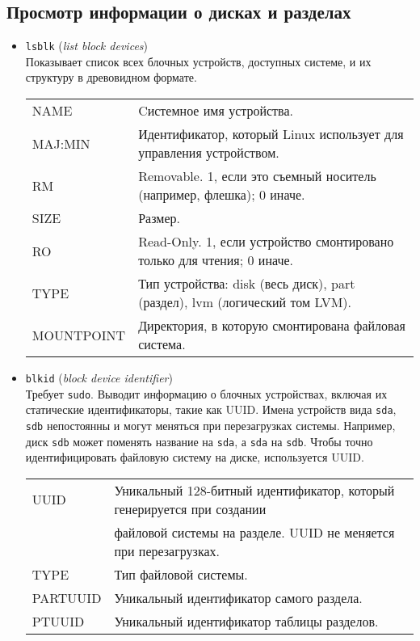 \documentclass[10pt]{article}
\begin{document}
\subsection*{Просмотр информации о дисках и разделах}
\begin{itemize}
\item \texttt{lsblk} (\textit{list block devices})\\
Показывает список всех блочных устройств, доступных системе, и их структуру в древовидном формате.

\begin{tabular}{ p{2.8cm} | l }
NAME & Cистемное имя устройства.\\
MAJ:MIN & Идентификатор, который Linux использует для управления устройством.\\
RM & Removable. 1, если это съемный носитель (например, флешка); 0 иначе.\\
SIZE & Размер.\\
RO & Read-Only. 1, если устройство смонтировано только для чтения; 0 иначе.\\
TYPE & Тип устройства: disk (весь диск), part (раздел), lvm (логический том LVM).\\
MOUNTPOINT & Директория, в которую смонтирована файловая система.
\end{tabular}

\item \texttt{blkid} (\textit{block device identifier})\\
Требует \texttt{sudo}. Выводит информацию о блочных устройствах, включая их статические идентификаторы, такие как UUID. Имена устройств вида \texttt{sda}, \texttt{sdb} непостоянны и могут меняться при перезагрузках системы. Например, диск \texttt{sdb} может поменять название на \texttt{sda}, а \texttt{sda} на \texttt{sdb}. Чтобы точно идентифицировать файловую систему на диске, используется UUID.

\begin{tabular}{ p{2.8cm} | l }
UUID & Уникальный 128-битный идентификатор, который генерируется при создании\\
&файловой системы на разделе. UUID не меняется при перезагрузках.\\
TYPE & Тип файловой системы. \\
PARTUUID & Уникальный идентификатор самого раздела. \\
PTUUID & Уникальный идентификатор таблицы разделов. \\
\end{tabular}


\end{itemize}
\end{document}

